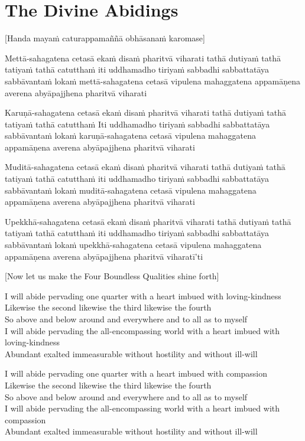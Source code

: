 \suttaRef{[AN 3.65 \& 5.57]}

\clearpage

\section{The Divine Abidings}
\label{divine-abidings}

\begin{center}
  [Handa mayaṁ caturappamaññā obhāsanaṁ karomase]
\end{center}

Mettā-sahagatena cetasā ekaṁ disaṁ pharitvā viharati tathā dutiyaṁ tathā tatiyaṁ tathā catutthaṁ iti uddhamadho tiriyaṁ sabbadhi sabbattatāya sabbāvantaṁ lokaṁ mettā-sahagatena cetasā vipulena mahaggatena appamāṇena averena abyāpajjhena pharitvā viharati

Karuṇā-sahagatena cetasā ekaṁ disaṁ pharitvā viharati tathā dutiyaṁ tathā tatiyaṁ tathā catutthaṁ
Iti uddhamadho tiriyaṁ sabbadhi sabbattatāya sabbāvantaṁ lokaṁ karuṇā-sahagatena cetasā vipulena mahaggatena appamāṇena averena abyāpajjhena pharitvā viharati

Muditā-sahagatena cetasā ekaṁ disaṁ pharitvā viharati tathā dutiyaṁ tathā tatiyaṁ tathā catutthaṁ iti uddhamadho tiriyaṁ sabbadhi sabbattatāya sabbāvantaṁ lokaṁ muditā-sahagatena cetasā vipulena mahaggatena appamāṇena averena abyāpajjhena pharitvā viharati

Upekkhā-sahagatena cetasā ekaṁ disaṁ pharitvā viharati tathā dutiyaṁ tathā tatiyaṁ tathā catutthaṁ iti uddhamadho tiriyaṁ sabbadhi sabbattatāya sabbāvantaṁ lokaṁ upekkhā-sahagatena cetasā vipulena mahaggatena appamāṇena averena abyāpajjhena pharitvā viharatī'ti

\begin{center}
  [Now let us make the Four Boundless Qualities shine forth]
\end{center}

I will abide pervading one quarter with a heart imbued with loving-kindness\\
Likewise the second likewise the third likewise the fourth\\
So above and below around and everywhere and to all as to myself\\
I will abide pervading the all-encompassing world with a heart imbued with loving-kindness\\
Abundant exalted immeasurable without hostility and without ill-will

I will abide pervading one quarter with a heart imbued with compassion\\
Likewise the second likewise the third likewise the fourth\\
So above and below around and everywhere and to all as to myself\\
I will abide pervading the all-encompassing world with a heart imbued with compassion\\
Abundant exalted immeasurable without hostility and without ill-will

